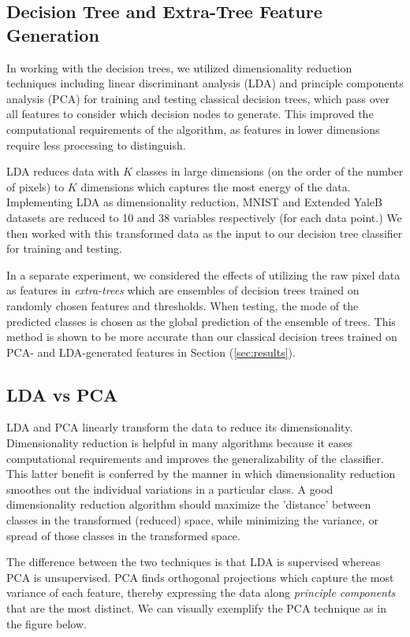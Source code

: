 \subsection{Decision Tree  and Extra-Tree Feature Generation}

In working with the decision trees, we utilized dimensionality reduction techniques including linear discriminant analysis (LDA) and principle components analysis (PCA) for training and testing classical decision trees, which pass over all features to consider which decision nodes to generate. This improved the computational requirements of the algorithm, as features in lower dimensions require less processing to distinguish.

LDA reduces data with $K$ classes in large dimensions (on the order of the number of pixels) to 
$K$ dimensions which captures the most energy of the data. Implementing LDA as dimensionality reduction, MNIST and Extended YaleB datasets are reduced to 10 and 38 variables respectively (for each data point.) We then worked with this transformed data as the input to our decision tree classifier for training and testing.

In a separate experiment, we considered the effects of utilizing the raw pixel data as features in \emph{extra-trees} which are ensembles of decision trees trained on randomly chosen features and thresholds. When testing, the mode of the predicted classes is chosen as the global prediction of the ensemble of trees. This method is shown to be more accurate than our classical decision trees trained on PCA- and LDA-generated features in Section (\ref{sec:results}).

\subsection{LDA vs PCA}

LDA and PCA linearly transform the data to reduce its dimensionality. Dimensionality reduction is helpful in many algorithms because it eases computational requirements and improves the generalizability of the classifier. This latter benefit is conferred by the manner in which dimensionality reduction smoothes out the individual variations in a particular class. A good dimensionality reduction algorithm should maximize the 'distance' between classes in the transformed (reduced) space, while minimizing the variance, or spread of those classes in the transformed space. 

The difference between the two techniques is that LDA is supervised whereas PCA is unsupervised. PCA finds orthogonal projections which capture the most variance of each feature, thereby expressing the data along \emph{principle components} that are the most distinct. We can visually exemplify the PCA technique as in the figure below. 

